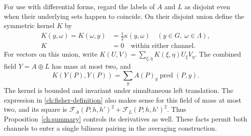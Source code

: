 For use with differential forms, regard the labels of $A$ and $L$ as
disjoint even when their underlying sets happen to coincide.  On their
disjoint union define the symmetric kernel $K$ by
\begin{equation}
 \begin{split}
 K(y,\omega)=K(\omega,y)&=\tfrac12\kappa(y,\omega)
       \quad(y\in G,\ \omega\in\Lambda),\\
 K&=0\quad\text{within either channel}.
 \end{split}
 \label{ch:symmetric-kernel}
\end{equation}
For vectors on this union, write $K(U,V)=\sum_{\xi,\eta}K(\xi,\eta)U_\xi V_\eta$.
The combined field $Y=A\oplus L$ has mass at most two, and
\begin{equation}
 K(Y(P),Y(P))
    =\sum_yA(P)_y\operatorname{pred}(P,y).
 \label{ch:kernel-diagonal}
\end{equation}
The kernel is bounded and invariant under simultaneous left translation.
The expression in \eqref{ch:fisher-definition} also makes sense for this
field of mass at most two, and its square is
$\mathcal F_A(P;h,h')^2+\mathcal F_L(P;h,h')^2$.
Thus Proposition~\ref{ch:summary} controls its derivatives as well.
These facts permit both channels to enter a single bilinear pairing in the
averaging construction.
